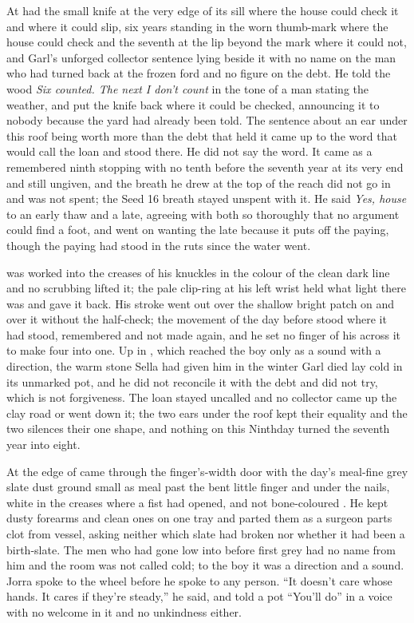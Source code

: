 At   had the small knife at the very edge of its sill where the house could check it and where it could slip, six years standing in the worn thumb-mark where the house could check and the seventh at the lip beyond the mark where it could not, and Garl's unforged collector sentence lying beside it with no name on the man who had turned back at the frozen ford and no figure on the debt. He told the wood \emph{Six counted. The next I don't count} in the tone of a man stating the weather, and put the knife back where it could be checked, announcing it to nobody because the yard had already been told. The sentence about an ear under this roof being worth more than the debt that held it came up to the word that would call the loan and stood there. He did not say the word. It came as a remembered ninth stopping with no tenth before the seventh year at its very end and still ungiven, and the breath he drew at the top of the reach did not go in and was not spent; the Seed 16 breath stayed unspent with it. He said \emph{Yes, house} to an early thaw and a late, agreeing with both so thoroughly that no argument could find a foot, and went on wanting the late because it puts off the paying, though the paying had stood in the ruts since the water went.

 was worked into the creases of his knuckles in the colour of the clean dark line and no scrubbing lifted it; the pale clip-ring at his left wrist held what light there was and gave it back. His stroke went out over the shallow bright patch on  and over it without the half-check; the movement of the day before stood where it had stood, remembered and not made again, and he set no finger of his across it to make four into one. Up in , which reached the boy only as a sound with a direction, the warm stone Sella had given him in the winter Garl died lay cold in its unmarked pot, and he did not reconcile it with the debt and did not try, which is not forgiveness. The loan stayed uncalled and no collector came up the clay road or went down it; the two ears under the roof kept their equality and the two silences their one shape, and nothing on this Ninthday turned the seventh year into eight.

At the edge of   came through the finger's-width door with the day's meal-fine grey slate dust ground small as meal past the bent little finger and under the nails, white in the creases where a fist had opened, and not bone-coloured . He kept dusty forearms and clean ones on one tray and parted them as a surgeon parts clot from vessel, asking neither which slate had broken nor whether it had been a birth-slate. The men who had gone low into  before first grey had no name from him and the room was not called cold; to the boy it was a direction and a sound. Jorra spoke to the wheel before he spoke to any person. “It doesn't care whose hands. It cares if they're steady,” he said, and told a pot “You'll do” in a voice with no welcome in it and no unkindness either.

